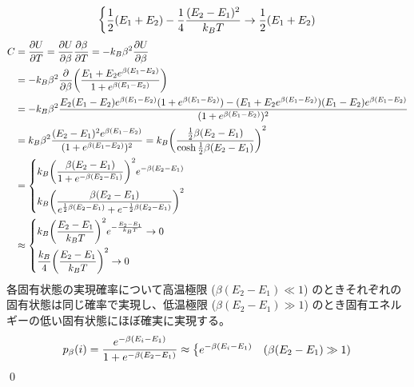 \documentclass[uplatex,dvipdfmx,a4paper,11pt]{jlreq}
\makeatletter
\theoremstyle{definition}
\renewenvironment{proof}[1][\proofname]{\par
  \normalfont
  \topsep6\p@\@plus6\p@ \trivlist
  \item[\hskip\labelsep{\bfseries #1}\@addpunct{\bfseries}]\ignorespaces\quad\par
}{%
  \qed\endtrivlist\@endpefalse
}
\renewcommand\proofname{証明}
\makeatother
\begin{document}
\begin{proof}
\begin{align}
\begin{dcases}
                  \frac{1}{2}(E_1 + E_2) - \frac{1}{4}\frac{(E_2 - E_1)^2}{k_BT} \to \frac{1}{2}(E_1 + E_2) \\
                \end{dcases}
  \end{align}
  \begin{align}
    C & = \pdv{U}{T} = \pdv{U}{\beta}\pdv{\beta}{T} = -k_B\beta^2\pdv{U}{\beta}                                                                                                         \\
      & = -k_B\beta^2\pdv{\beta}\qty(\frac{E_1 + E_2e^{\beta(E_1 - E_2)}}{1 + e^{\beta(E_1 - E_2)}})                                                                                    \\
      & = -k_B\beta^2\frac{E_2(E_1 - E_2)e^{\beta(E_1 - E_2)}(1 + e^{\beta(E_1 - E_2)}) - (E_1 + E_2e^{\beta(E_1 - E_2)})(E_1 - E_2)e^{\beta(E_1 - E_2)}}{(1 + e^{\beta(E_1 - E_2)})^2} \\
      & = k_B\beta^2\frac{(E_2 - E_1)^2e^{\beta(E_1 - E_2)}}{(1 + e^{\beta(E_1 - E_2)})^2} = k_B\qty(\frac{\frac{1}{2}\beta(E_2 - E_1)}{\cosh\frac{1}{2}\beta(E_2 - E_1)})^2            \\
      & = \begin{dcases}
            k_B\qty(\frac{\beta(E_2 - E_1)}{1 + e^{-\beta(E_2 - E_1)}})^2e^{-\beta(E_2 - E_1)} \\
            k_B\qty(\frac{\beta(E_2 - E_1)}{e^{\frac{1}{2}\beta(E_2 - E_1)} + e^{-\frac{1}{2}\beta(E_2 - E_1)}})^2
          \end{dcases}                                                         \\
      & \approx \begin{dcases}
                  k_B\qty(\frac{E_2 - E_1}{k_BT})^2e^{-\frac{E_2 - E_1}{k_BT}} \to 0 \\
                  \frac{k_B}{4}\qty(\frac{E_2 - E_1}{k_BT})^2 \to 0
                \end{dcases}
  \end{align}
  各固有状態の実現確率について高温極限 ($\beta(E_2 - E_1) \ll 1$) のときそれぞれの固有状態は同じ確率で実現し、低温極限 ($\beta(E_2 - E_1) \gg 1$) のとき固有エネルギーの低い固有状態にほぼ確実に実現する。
  \begin{align}
    \quad p_\beta(i) & = \frac{e^{-\beta (E_i - E_1)}}{1 + e^{-\beta(E_2 - E_1)}} \approx \begin{dcases}
                                                                                            e^{-\beta (E_i - E_1)} & (\beta(E_2 - E_1) \gg 1) \\

\end{dcases}
\end{align}
\end{proof}
\end{document}
